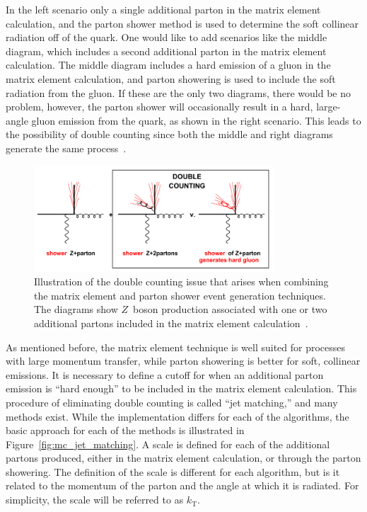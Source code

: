 In the left scenario only a single additional parton in the matrix element
calculation, and the parton shower method is used to determine the soft
collinear radiation off of the quark.
One would like to add scenarios like the middle diagram, which includes a
second additional parton in the matrix element calculation.
The middle diagram includes a hard emission of a gluon in the matrix element
calculation, and parton showering is used to include the soft radiation from
the gluon.
If these are the only two diagrams, there would be no problem, however, the
parton shower will occasionally result in a hard, large-angle gluon emission
from the quark, as shown in the right scenario.
This leads to the possibility of double counting since both the middle and
right diagrams generate the same process~\cite{Salam:2010zt}.

\begin{figure}
  \centering
  \includegraphics[width=0.8\textwidth]{figs/mc_gen/double_conting.png}
  \caption[
    Illustration of the double counting issue that arises when combining the
    matrix element and parton shower event generation
    techniques~\cite{Salam:2010zt}.
  ]{
    Illustration of the double counting issue that arises when combining the
    matrix element and parton shower event generation techniques.
    The diagrams show $Z$~boson production associated with one or two
    additional partons included in the matrix element
    calculation~\cite{Salam:2010zt}.
  }
  \label{fig:mc_double_counting}
\end{figure}

As mentioned before, the matrix element technique is well suited for processes
with large momentum transfer, while parton showering is better for soft,
collinear emissions.
It is necessary to define a cutoff for when an additional parton emission is
``hard enough'' to be included in the matrix element calculation.
This procedure of eliminating double counting is called ``jet matching,'' and
many methods exist.
While the implementation differs for each of the algorithms, the basic approach
for each of the methods is illustrated in Figure~\ref{fig:mc_jet_matching}.
A scale is defined for each of the additional partons produced, either in the
matrix element calculation, or through the parton showering.
The definition of the scale is different for each algorithm, but is it related
to the momentum of the parton and the angle at which it is radiated.
For simplicity, the scale will be referred to as $k_\mathrm{T}$.

